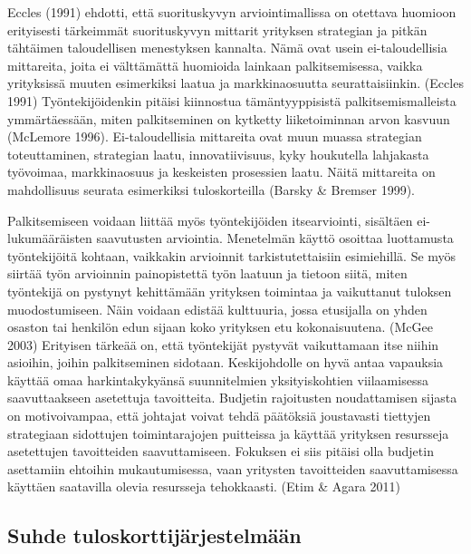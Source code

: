 \documentclass[12pt,a4paper,oneside,pdftex]{report}
\begin{document}
Eccles (1991) ehdotti, että suorituskyvyn arviointimallissa on otettava huomioon erityisesti tärkeimmät suorituskyvyn mittarit yrityksen strategian ja pitkän tähtäimen taloudellisen menestyksen kannalta. Nämä ovat usein ei-taloudellisia mittareita, joita ei välttämättä huomioida lainkaan palkitsemisessa, vaikka yrityksissä muuten esimerkiksi laatua ja markkinaosuutta seurattaisiinkin. (Eccles 1991) Työntekijöidenkin pitäisi kiinnostua tämäntyyppisistä palkitsemismalleista ymmärtäessään, miten palkitseminen on kytketty liiketoiminnan arvon kasvuun (McLemore 1996). Ei-taloudellisia mittareita ovat muun muassa strategian toteuttaminen, strategian laatu, innovatiivisuus, kyky houkutella lahjakasta työvoimaa, markkinaosuus ja keskeisten prosessien laatu. Näitä mittareita on mahdollisuus seurata esimerkiksi tuloskorteilla (Barsky & Bremser 1999).

Palkitsemiseen voidaan liittää myös työntekijöiden itsearviointi, sisältäen ei-lukumääräisten saavutusten arviointia. Menetelmän käyttö osoittaa luottamusta työntekijöitä kohtaan, vaikkakin arvioinnit tarkistutettaisiin esimiehillä. Se myös siirtää työn arvioinnin painopistettä työn laatuun ja tietoon siitä, miten työntekijä on pystynyt kehittämään yrityksen toimintaa ja vaikuttanut tuloksen muodostumiseen. Näin voidaan edistää kulttuuria, jossa etusijalla on yhden osaston tai henkilön edun sijaan koko yrityksen etu kokonaisuutena. (McGee 2003) Erityisen tärkeää on, että työntekijät pystyvät vaikuttamaan itse niihin asioihin, joihin palkitseminen sidotaan. Keskijohdolle on hyvä antaa vapauksia käyttää omaa harkintakykyänsä suunnitelmien yksityiskohtien viilaamisessa saavuttaakseen asetettuja tavoitteita. Budjetin rajoitusten noudattamisen sijasta on motivoivampaa, että johtajat voivat tehdä päätöksiä joustavasti tiettyjen strategiaan sidottujen toimintarajojen puitteissa ja käyttää yrityksen resursseja asetettujen tavoitteiden saavuttamiseen. Fokuksen ei siis pitäisi olla budjetin asettamiin ehtoihin mukautumisessa, vaan yritysten tavoitteiden saavuttamisessa käyttäen saatavilla olevia resursseja tehokkaasti. (Etim & Agara 2011)

\subsection{Suhde tuloskorttijärjestelmään}
\end{document}
